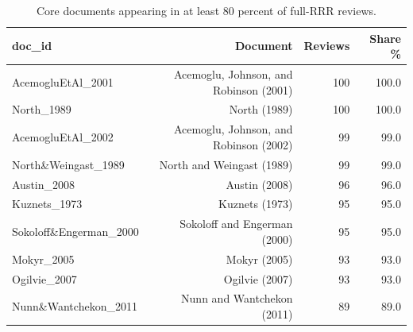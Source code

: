 \begin{table}[ht]
\centering
\caption{Core documents appearing in at least 80 percent of full-RRR reviews.}
\begin{tabular}{lrrr}
\toprule
doc\_id & Document & Reviews & Share \% \\
\midrule
AcemogluEtAl\_2001 & Acemoglu, Johnson, and Robinson (2001) & 100 & 100.0 \\
North\_1989 & North (1989) & 100 & 100.0 \\
AcemogluEtAl\_2002 & Acemoglu, Johnson, and Robinson (2002) & 99 & 99.0 \\
North\&Weingast\_1989 & North and Weingast (1989) & 99 & 99.0 \\
Austin\_2008 & Austin (2008) & 96 & 96.0 \\
Kuznets\_1973 & Kuznets (1973) & 95 & 95.0 \\
Sokoloff\&Engerman\_2000 & Sokoloff and Engerman (2000) & 95 & 95.0 \\
Mokyr\_2005 & Mokyr (2005) & 93 & 93.0 \\
Ogilvie\_2007 & Ogilvie (2007) & 93 & 93.0 \\
Nunn\&Wantchekon\_2011 & Nunn and Wantchekon (2011) & 89 & 89.0 \\
\bottomrule
\end{tabular}
\end{table}
